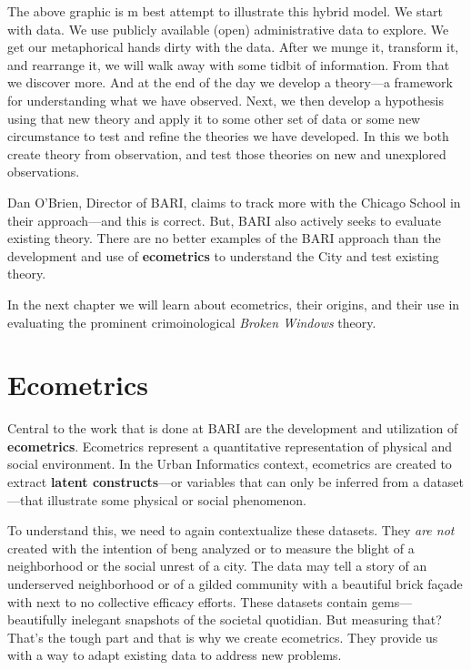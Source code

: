 \documentclass[
]{book}
\begin{document}
The above graphic is m best attempt to illustrate this hybrid model. We start with data. We use publicly available (open) administrative data to explore. We get our metaphorical hands dirty with the data. After we munge it, transform it, and rearrange it, we will walk away with some tidbit of information. From that we discover more. And at the end of the day we develop a theory---a framework for understanding what we have observed. Next, we then develop a hypothesis using that new theory and apply it to some other set of data or some new circumstance to test and refine the theories we have developed. In this we both create theory from observation, and test those theories on new and unexplored observations.

Dan O'Brien, Director of BARI, claims to track more with the Chicago School in their approach---and this is correct. But, BARI also actively seeks to evaluate existing theory. There are no better examples of the BARI approach than the development and use of \textbf{ecometrics} to understand the City and test existing theory.

In the next chapter we will learn about ecometrics, their origins, and their use in evaluating the prominent crimoinological \emph{Broken Windows} theory.

\hypertarget{ecometrics}{%
\chapter{Ecometrics}\label{ecometrics}}

Central to the work that is done at BARI are the development and utilization of \textbf{ecometrics}. Ecometrics represent a quantitative representation of physical and social environment. In the Urban Informatics context, ecometrics are created to extract \textbf{latent constructs}---or variables that can only be inferred from a dataset---that illustrate some physical or social phenomenon.

To understand this, we need to again contextualize these datasets. They \emph{are not} created with the intention of beng analyzed or to measure the blight of a neighborhood or the social unrest of a city. The data may tell a story of an underserved neighborhood or of a gilded community with a beautiful brick façade with next to no collective efficacy efforts. These datasets contain gems---beautifully inelegant snapshots of the societal quotidian. But measuring that? That's the tough part and that is why we create ecometrics. They provide us with a way to adapt existing data to address new problems.
\end{document}
